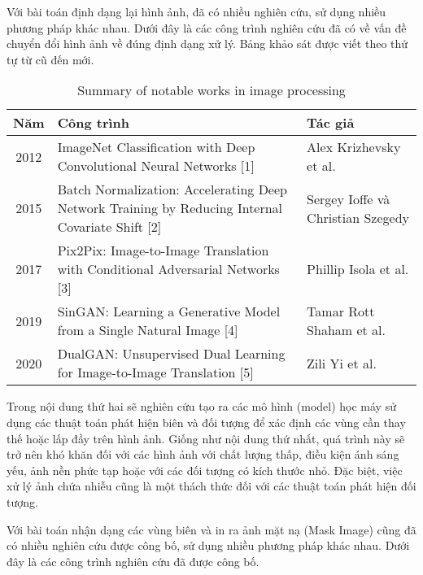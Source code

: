 \documentclass[12pt]{report}
\begin{document}
Với bài toán định dạng lại hình ảnh, đã có nhiều nghiên cứu, sử dụng nhiều phương pháp khác nhau. Dưới đây là các công trình nghiên cứu đã có về vấn đề chuyển đổi hình ảnh về đúng định dạng xử lý. Bảng khảo sát được viết theo thứ tự từ cũ đến mới.

\vspace{1em}

\begin{table}[H]
\centering
\caption{Summary of notable works in image processing}
\begin{tabular}{|c|p{6cm}|p{5cm}|}
    \hline
    \textbf{Năm} & \textbf{Công trình} & \textbf{Tác giả} \\
    \hline
    2012 & ImageNet Classification with Deep Convolutional Neural Networks [1] & Alex Krizhevsky et al. \\
    \hline
    2015 & Batch Normalization: Accelerating Deep Network Training by Reducing Internal Covariate Shift [2] & Sergey Ioffe và Christian Szegedy \\
    \hline
    2017 & Pix2Pix: Image-to-Image Translation with Conditional Adversarial Networks [3] & Phillip Isola et al. \\
    \hline
    2019 & SinGAN: Learning a Generative Model from a Single Natural Image [4] & Tamar Rott Shaham et al. \\
    \hline
    2020 & DualGAN: Unsupervised Dual Learning for Image-to-Image Translation [5] & Zili Yi et al. \\
    \hline
\end{tabular}
\label{tab:image_processing_works}
\end{table}

\vspace{1em}

Trong nội dung thứ hai sẽ nghiên cứu tạo ra các mô hình (model) học máy sử dụng các thuật toán phát hiện biên và đối tượng để xác định các vùng cần thay thế hoặc lấp đầy trên hình ảnh. Giống như nội dung thứ nhất, quá trình này sẽ trở nên khó khăn đối với các hình ảnh với chất lượng thấp, điều kiện ánh sáng yếu, ảnh nền phức tạp hoặc với các đối tượng có kích thước nhỏ. Đặc biệt, việc xử lý ảnh chứa nhiễu cũng là một thách thức đối với các thuật toán phát hiện đối tượng.

Với bài toán nhận dạng các vùng biên và in ra ảnh mặt nạ (Mask Image) cũng đã có nhiều nghiên cứu được công bố, sử dụng nhiều phương pháp khác nhau. Dưới đây là các công trình nghiên cứu đã được công bố.

\vspace{1em}
\end{document}
